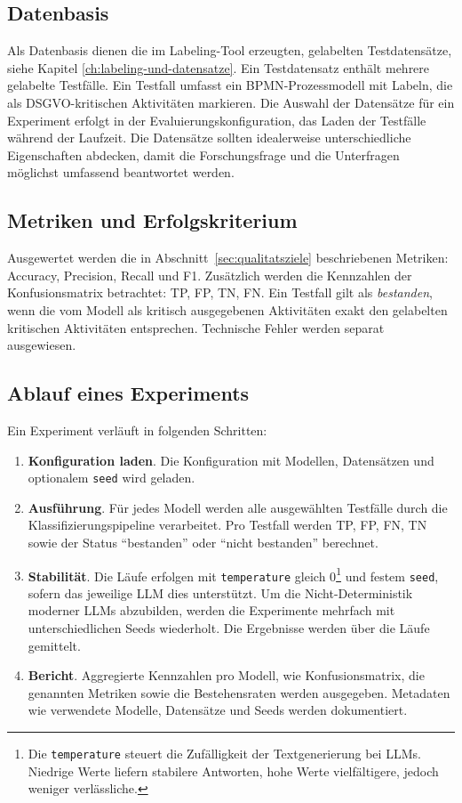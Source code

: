 \subsection*{Datenbasis}

Als Datenbasis dienen die im Labeling-Tool erzeugten, gelabelten Testdatensätze, siehe Kapitel \ref{ch:labeling-und-datensatze}. Ein Testdatensatz enthält mehrere gelabelte Testfälle. Ein Testfall umfasst ein \ac{BPMN}-Prozessmodell mit Labeln, die als \ac{DSGVO}-kritischen Aktivitäten markieren. Die Auswahl der Datensätze für ein Experiment erfolgt in der Evaluierungskonfiguration, das Laden der Testfälle während der Laufzeit. Die Datensätze sollten idealerweise unterschiedliche Eigenschaften abdecken, damit die Forschungsfrage und die Unterfragen möglichst umfassend beantwortet werden.

\subsection*{Metriken und Erfolgskriterium}

Ausgewertet werden die in Abschnitt~\ref{sec:qualitatsziele} beschriebenen Metriken: Accuracy, Precision, Recall und F1. Zusätzlich werden die Kennzahlen der Konfusionsmatrix betrachtet: \ac{TP}, \ac{FP}, \ac{TN}, \ac{FN}. Ein Testfall gilt als \emph{bestanden}, wenn die vom Modell als kritisch ausgegebenen Aktivitäten exakt den gelabelten kritischen Aktivitäten entsprechen. Technische Fehler werden separat ausgewiesen.

\subsection*{Ablauf eines Experiments}

Ein Experiment verläuft in folgenden Schritten:

\begin{enumerate}
    \item \textbf{Konfiguration laden}. Die Konfiguration mit Modellen, Datensätzen und optionalem \texttt{seed} wird geladen.
    \item \textbf{Ausführung}. Für jedes Modell werden alle ausgewählten Testfälle durch die Klassifizierungspipeline verarbeitet. Pro Testfall werden \ac{TP}, \ac{FP}, \ac{FN}, \ac{TN} sowie der Status \enquote{bestanden} oder \enquote{nicht bestanden} berechnet.
    \item \textbf{Stabilität}. Die Läufe erfolgen mit \texttt{temperature} gleich 0\footnote{Die \texttt{temperature} steuert die Zufälligkeit der Textgenerierung bei \acp{LLM}. Niedrige Werte liefern stabilere Antworten, hohe Werte vielfältigere, jedoch weniger verlässliche.} und festem \texttt{seed}, sofern das jeweilige \ac{LLM} dies unterstützt. Um die Nicht-Deterministik moderner \acp{LLM} abzubilden, werden die Experimente mehrfach mit unterschiedlichen Seeds wiederholt. Die Ergebnisse werden über die Läufe gemittelt.
    \item \textbf{Bericht}. Aggregierte Kennzahlen pro Modell, wie Konfusionsmatrix, die genannten Metriken sowie die Bestehensraten werden ausgegeben. Metadaten wie verwendete Modelle, Datensätze und Seeds werden dokumentiert.
\end{enumerate}

